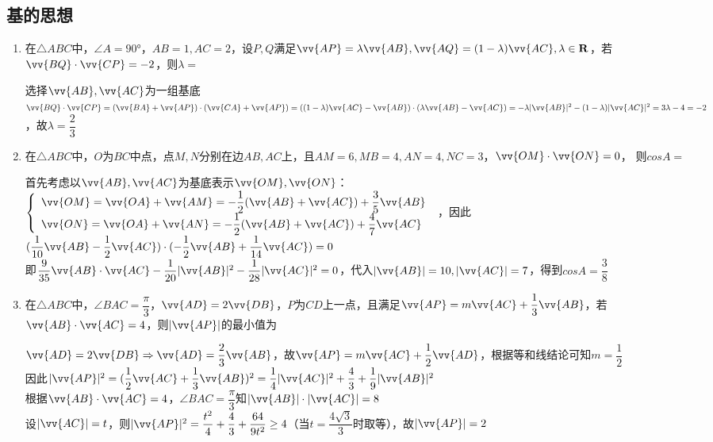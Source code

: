 \subsection*{基的思想}
\begin{enumerate}
    \item 在$\triangle ABC$中，$\angle A = \ang{90}$，$AB = 1, AC = 2$，设$P, Q$满足$\vv{AP} = \lambda \vv{AB}, \vv{AQ} = (1-\lambda)\vv{AC}, \lambda \in \mathbf{R}$，若$\vv{BQ} \cdot \vv{CP} = -2$，则$\lambda = $ 
    \begin{jieda}
        选择$\vv{AB}, \vv{AC}$为一组基底 \\
        $\vv{BQ} \cdot \vv{CP} = (\vv{BA} + \vv{AP}) \cdot (\vv{CA} + \vv{AP}) = ((1-\lambda)\vv{AC} - \vv{AB}) \cdot (\lambda \vv{AB} - \vv{AC}) = -\lambda|\vv{AB}|^2 - (1-\lambda)|\vv{AC}|^2 = 3\lambda - 4 = -2$，故$\lambda = \dfrac{2}{3}$
    \end{jieda}

    \item 在$\triangle ABC$中，$O$为$BC$中点，点$M,N$分别在边$AB, AC$上，且$AM = 6, MB = 4, AN = 4, NC = 3$，$\vv{OM} \cdot \vv{ON} = 0$， 则$cos A = $
    \begin{jieda}
        首先考虑以$\vv{AB}, \vv{AC}$为基底表示$\vv{OM}, \vv{ON}$：\\
        $\left \{ \begin{array}{l}
                \vv{OM} = \vv{OA} + \vv{AM} = -\dfrac{1}{2}(\vv{AB} + \vv{AC}) + \dfrac{3}{5} \vv{AB}  \\
                \vv{ON} = \vv{OA} + \vv{AN} = -\dfrac{1}{2}(\vv{AB} + \vv{AC}) + \dfrac{4}{7} \vv{AC}
        \end{array} \right .$ ，因此$(\dfrac{1}{10}\vv{AB} - \dfrac{1}{2}\vv{AC}) \cdot (-\dfrac{1}{2}\vv{AB} + \dfrac{1}{14}\vv{AC}) = 0$ \\
        即$\dfrac{9}{35} \vv{AB} \cdot \vv{AC} - \dfrac{1}{20}|\vv{AB}|^2 - \dfrac{1}{28}|\vv{AC}|^2 = 0$，代入$|\vv{AB}| = 10, |\vv{AC}| = 7$，得到$cos A = \dfrac{3}{8}$
    \end{jieda}

    \item 在$\triangle ABC$中，$\angle BAC = \dfrac{\pi}{3}$，$\vv{AD} = 2\vv{DB}$，$P$为$CD$上一点，且满足$\vv{AP} = m\vv{AC} + \dfrac{1}{3}\vv{AB}$，若$\vv{AB} \cdot \vv{AC} = 4$，则$|\vv{AP}|$的最小值为
    \begin{jieda}
        $\vv{AD} = 2\vv{DB} \Rightarrow \vv{AD} = \dfrac{2}{3}\vv{AB}$，故$\vv{AP} = m \vv{AC} + \dfrac{1}{2}\vv{AD}$，根据等和线结论可知$m = \dfrac{1}{2}$ \\
        因此$|\vv{AP}|^2 = (\dfrac{1}{2}\vv{AC} + \dfrac{1}{3}\vv{AB})^2 = \dfrac{1}{4}|\vv{AC}|^2 + \dfrac{4}{3} + \dfrac{1}{9}|\vv{AB}|^2$\\
        根据$\vv{AB} \cdot \vv{AC} = 4$，$\angle BAC = \dfrac{\pi}{3}$知$|\vv{AB}| \cdot |\vv{AC}| = 8$ \\
        设$|\vv{AC}| = t$，则$|\vv{AP}|^2 = \dfrac{t^2}{4} + \dfrac{4}{3} + \dfrac{64}{9t^2} \geq 4$（当$t = \dfrac{4\sqrt{3}}{3}$时取等），故$|\vv{AP}| = 2$
    \end{jieda}
\end{enumerate}
